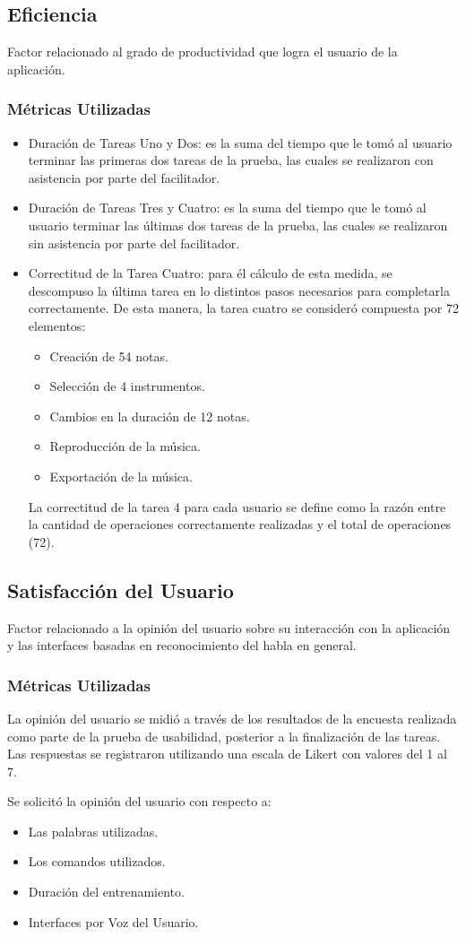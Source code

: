 \subsection{Eficiencia}
Factor relacionado al grado de productividad que logra el usuario de la aplicación.
\subsubsection{Métricas Utilizadas}
\begin{itemize}
	\item Duración de Tareas Uno y Dos: es la suma del tiempo que le tomó al usuario
	terminar las primeras dos tareas de la prueba, las cuales se realizaron con asistencia por
	parte del facilitador.
	\item Duración de Tareas Tres y Cuatro: es la suma del tiempo que le tomó al usuario
	terminar las últimas dos tareas de la prueba, las cuales se realizaron sin asistencia por
	parte del facilitador.
	\item Correctitud de la Tarea Cuatro: para él cálculo de esta medida, se descompuso la
	última tarea en lo distintos pasos necesarios para completarla correctamente.
	De esta manera, la tarea cuatro se consideró compuesta por 72 elementos:
	\begin{itemize}
		\item Creación de 54 notas.
		\item Selección de 4 instrumentos.
		\item Cambios en la duración de 12 notas.
		\item Reproducción de la música.
		\item Exportación de la música.
	\end{itemize}
	La correctitud de la tarea 4 para cada usuario se define como la razón entre la cantidad de operaciones
	correctamente realizadas y el total de operaciones (72).
\end{itemize}

\subsection{Satisfacción del Usuario}
Factor relacionado a la opinión del usuario sobre su interacción con la aplicación y las interfaces
basadas en reconocimiento del habla en general.
\subsubsection{Métricas Utilizadas}
La opinión del usuario se midió a través de los resultados de la encuesta realizada como parte de
la prueba de usabilidad, posterior a la finalización de las tareas. Las respuestas se
registraron utilizando una escala de Likert \cite{Allen:2007} con valores del 1 al 7.

Se solicitó la opinión del usuario con respecto a:
\begin{itemize}
	\item Las palabras utilizadas.
	\item Los comandos utilizados.
	\item Duración del entrenamiento.
	\item Interfaces por Voz del Usuario.
\end{itemize}




